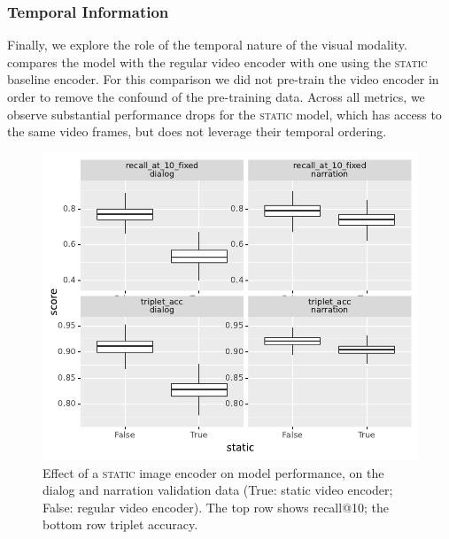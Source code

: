 \subsubsection{Temporal Information}
Finally, we explore the role of the temporal nature of the visual
modality.   compares the model with the regular video
encoder with one using the \textsc{static} baseline encoder.  For this
comparison we did not pre-train the video encoder in order to remove
the confound of the pre-training data.
Across
all metrics, we observe substantial performance drops for the
\textsc{static} model, which has access to the same video frames, but
does not leverage their temporal ordering. 
\begin{figure}[htb]
  \centering
  \includegraphics[width=\columnwidth]{results/ablations/static.pdf}
  \caption{Effect of a \textsc{static} image encoder on model
    performance, on the dialog and narration validation data (True:
    static video encoder; False: regular video encoder). The top row
    shows recall@10; the bottom row triplet accuracy.}
  \label{fig:static}
\end{figure}

